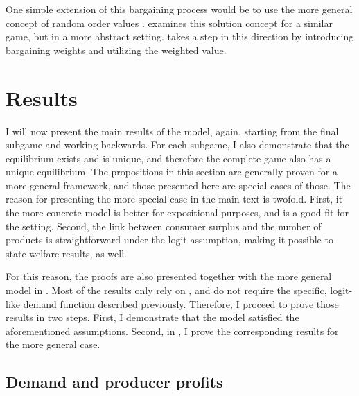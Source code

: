\documentclass[a4paper]{article}
\begin{document}
One simple extension of this bargaining process would be to use the more general concept of random order values \parencite{weber1988probabilistic}.
\textcite{stancsics2023value} examines this solution concept for a similar game, but in a more abstract setting.
 takes a step in this direction by introducing bargaining weights and utilizing the weighted value.

\section{Results}
\label{sec:results}

I will now present the main results of the model, again, starting from the final subgame and working backwards.
For each subgame, I also demonstrate that the equilibrium exists and is unique, and therefore the complete game also has a unique equilibrium.
The propositions in this section are generally proven for a more general framework, and those presented here are special cases of those.
The reason for presenting the more special case in the main text is twofold.
First, it the more concrete model is better for expositional purposes, and is a good fit for the setting.
Second, the link between consumer surplus and the number of products is straightforward under the logit assumption, making it possible to state welfare results, as well.

For this reason, the proofs are also presented together with the more general model in .
Most of the results only rely on , and do not require the specific, logit-like demand function described previously.
Therefore, I proceed to prove those results in two steps.
First, I demonstrate that the model satisfied the aforementioned assumptions.
Second, in , I prove the corresponding results for the more general case.

\subsection{Demand and producer profits}
\label{sec:results_demand}
\end{document}
